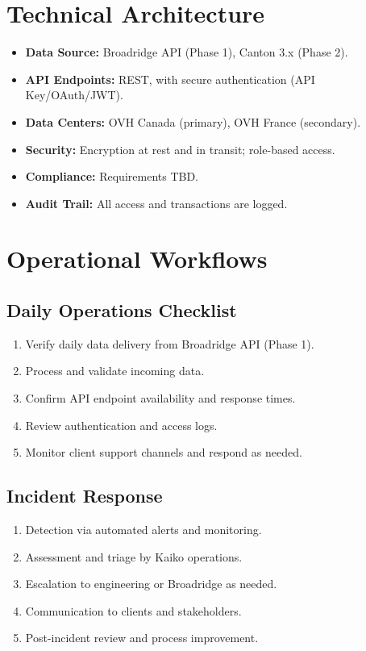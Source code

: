 \documentclass[12pt,a4paper]{article}
\begin{document}
\section{Technical Architecture}

\begin{itemize}[leftmargin=*]
    \item \textbf{Data Source:} Broadridge API (Phase 1), Canton 3.x (Phase 2).
    \item \textbf{API Endpoints:} REST, with secure authentication (API Key/OAuth/JWT).
    \item \textbf{Data Centers:} OVH Canada (primary), OVH France (secondary).
    \item \textbf{Security:} Encryption at rest and in transit; role-based access.
    \item \textbf{Compliance:} Requirements TBD.
    \item \textbf{Audit Trail:} All access and transactions are logged.
\end{itemize}

\section{Operational Workflows}

\subsection*{Daily Operations Checklist}
\begin{enumerate}
    \item Verify daily data delivery from Broadridge API (Phase 1).
    \item Process and validate incoming data.
    \item Confirm API endpoint availability and response times.
    \item Review authentication and access logs.
    \item Monitor client support channels and respond as needed.
\end{enumerate}

\subsection*{Incident Response}
\begin{enumerate}
    \item Detection via automated alerts and monitoring.
    \item Assessment and triage by Kaiko operations.
    \item Escalation to engineering or Broadridge as needed.
    \item Communication to clients and stakeholders.
    \item Post-incident review and process improvement.
\end{enumerate}
\end{document}
